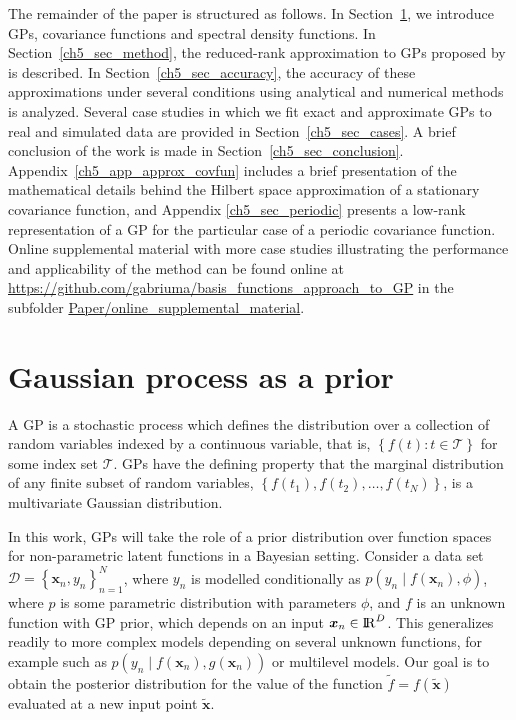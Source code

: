 \documentclass[onecolumn,a4paper,11pt]{article}
\begin{document}
The remainder of the paper is structured as follows. In Section~\ref{ch4_gp}, we introduce GPs, covariance functions and spectral density functions. In Section~\ref{ch5_sec_method}, the reduced-rank approximation to GPs proposed by \citet{solin2018hilbert} is described. In Section~\ref{ch5_sec_accuracy}, the accuracy of these approximations under several conditions using analytical and numerical methods is analyzed. Several case studies in which we fit exact and approximate GPs to real and simulated data are provided in Section~\ref{ch5_sec_cases}. A brief conclusion of the work is made in Section~\ref{ch5_sec_conclusion}. Appendix~\ref{ch5_app_approx_covfun} includes a brief presentation of the mathematical details behind the Hilbert space approximation of a stationary covariance function, and Appendix \ref{ch5_sec_periodic} presents a low-rank representation of a GP for the particular case of a periodic covariance function. Online supplemental material with more case studies illustrating the performance and applicability of the method can be found online at \url{https://github.com/gabriuma/basis_functions_approach_to_GP} in the subfolder \url{Paper/online_supplemental_material}.


\section{Gaussian process as a prior}\label{ch4_gp}

A GP is a stochastic process which defines the distribution over a collection of random variables indexed by a continuous variable, that is, $\left\lbrace f(t): t \in \mathcal{T}\right\rbrace$ for some index set $\mathcal{T}$. GPs have the defining property that the marginal distribution of any finite subset of random variables, $\left\lbrace f(t_1), f(t_2), \hdots, f(t_N) \right\rbrace$, is a multivariate Gaussian distribution.

In this work, GPs will take the role of a prior distribution over function spaces for non-parametric latent functions in a Bayesian setting. Consider a data set $\mathcal{D} = \left\lbrace \bm{x}_n, y_n \right\rbrace_{n=1}^N$, where $y_n$ is modelled conditionally as $p(y_n \mid f(\bm{x}_n),\phi)$, where $p$ is some parametric distribution with parameters  $\phi$, and $f$ is an unknown function with GP prior, which depends on an input $\bm{x}_n\in {\rm I\!R}^D$. This generalizes readily to more complex models depending on several unknown functions, for example such as $p(y_n \mid f(\bm{x}_n),g(\bm{x}_n))$ or multilevel models. Our goal is to obtain the posterior distribution for the value of the function $\tilde{f}=f(\tilde{\bm{x}})$  evaluated at a new input point $\tilde{\bm{x}}$.
\end{document}
